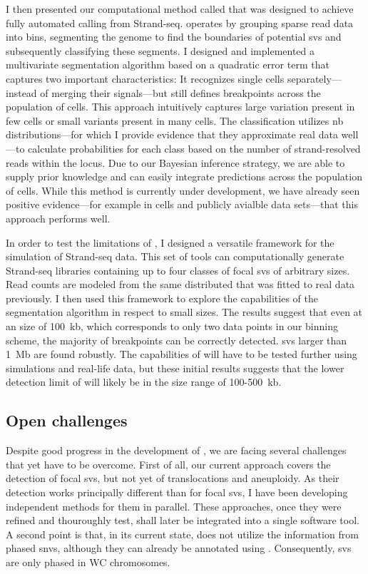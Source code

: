 I then presented our computational method called \mc that was designed to achieve
fully automated \sv calling from Strand-seq. \mc operates by grouping sparse
read data into bins, segmenting the genome to find the boundaries of potential
\acp{sv} and subsequently classifying these segments. I designed and implemented
a multivariate segmentation algorithm based on a quadratic error term that
captures two important characteristics: It recognizes single cells
separately---instead of merging their signals---but still defines breakpoints
across the population of cells. This approach intuitively captures large
variation present in few cells or small variants present in many cells. The \sv
classification utilizes \acl{nb} distributions---for which I provide evidence
that they approximate real data well---to calculate probabilities for each \sv
class based on the number of strand-resolved reads within the locus.
Due to our Bayesian inference strategy, we are able to supply prior knowledge
and can easily integrate \sv predictions across the population of cells. While
this method is currently under development, we have already seen positive
evidence---for example in \rpe cells and publicly avialble data sets---that this
approach performs well.

In order to test the limitations of \mc, I designed a versatile framework for
the simulation of Strand-seq data. This set of tools can computationally generate
Strand-seq libraries containing up to four classes of focal \acp{sv} of arbitrary
sizes. Read counts are modeled from the same \nb distributed that was fitted to
real data previously. I then used this framework to explore the capabilities of
the segmentation algorithm in respect to small \sv sizes. The results suggest that
even at an \sv size of 100~kb, which corresponds to only two data points in our
binning scheme, the majority of breakpoints can be correctly detected.
\Acp{sv} larger than 1~Mb are found robustly. The capabilities of \mc will have
to be tested further using simulations and real-life data, but these initial
results suggests that the lower detection limit of \mc will likely be in the
size range of 100-500~kb.




\subsection{Open challenges}
\label{sec:mosaic_challenges}

Despite good progress in the development of \mc, we are facing several
challenges that yet have to be overcome. First of all, our current approach
covers the detection of focal \acp{sv}, but not yet of translocations and
aneuploidy. As their detection works principally different than for focal \acp{sv},
I have been developing independent methods for them in parallel. These approaches,
once they were refined and thouroughly test, shall later be integrated into a
single software tool. A second point is that, in its current state, \mc does not
utilize the information from phased \acp{snv}, although they can already be
annotated using \strandphaser. Consequently, \acp{sv} are only phased in WC
chromosomes.

